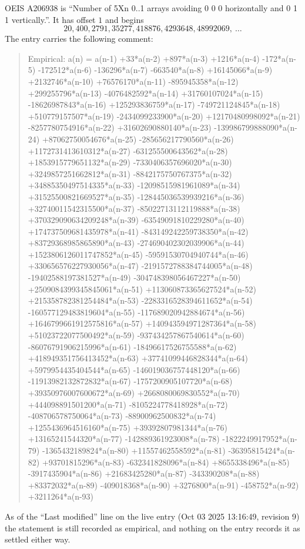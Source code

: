 \documentclass[11pt,a4paper]{article}
\theoremstyle{plain}
\theoremstyle{definition}
\begin{document}
OEIS A206938 is ``Number of 5Xn 0..1 arrays avoiding 0 0 0 horizontally and 0 1 1 vertically.''. It has offset
$1$ and begins
\[
20, 400, 2791, 35277, 418876, 4293648, 48992069,\ \dots
\]
The entry carries the following comment:
\begin{quote}\small
Empirical: a(n) = a(n-1) +33*a(n-2) +897*a(n-3) +1216*a(n-4) -172*a(n-5) -172512*a(n-6) -136296*a(n-7) -663540*a(n-8) +16145066*a(n-9) +2132746*a(n-10) +76576170*a(n-11) -895945358*a(n-12) +299255796*a(n-13) -4076482592*a(n-14) +31760107024*a(n-15) -18626987843*a(n-16) +125293836759*a(n-17) -749721124845*a(n-18) +510779157507*a(n-19) -2434099233900*a(n-20) +12170480998092*a(n-21) -8257780754916*a(n-22) +31602690880140*a(n-23) -139986799888090*a(n-24) +87062750054676*a(n-25) -285656217790560*a(n-26) +1172731413610312*a(n-27) -631255500643562*a(n-28) +1853915779651132*a(n-29) -7330406357696020*a(n-30) +3249857251662812*a(n-31) -8842175750767375*a(n-32) +34885350497514335*a(n-33) -12098515981961089*a(n-34) +31525500821669527*a(n-35) -128445036539939216*a(n-36) +32740011542315500*a(n-37) -85022713112119888*a(n-38) +370329090634209248*a(n-39) -63549091810229280*a(n-40) +174737509681435978*a(n-41) -843149242259738350*a(n-42) +83729368985865890*a(n-43) -274690402302039906*a(n-44) +1523806126011747852*a(n-45) -59591530704940744*a(n-46) +330656576227930056*a(n-47) -2191572788384744005*a(n-48) -19402588197381527*a(n-49) -304748398056467227*a(n-50) +2509084399345845061*a(n-51) +113060873365627524*a(n-52) +215358782381254484*a(n-53) -2283316528394611652*a(n-54) -160577129483819604*a(n-55) -117689020942884674*a(n-56) +1646799661912575816*a(n-57) +140943594971287364*a(n-58) +51023722077500492*a(n-59) -937434257867540614*a(n-60) -86076791906215996*a(n-61) -18496617526755588*a(n-62) +418949351756413452*a(n-63) +37741099446828344*a(n-64) +5979954435404544*a(n-65) -146019036757448120*a(n-66) -11913982132872832*a(n-67) -1757200905107720*a(n-68) +39350976007600672*a(n-69) +2668080069830552*a(n-70) +444098891501200*a(n-71) -8105224778418928*a(n-72) -408706578750064*a(n-73) -88900962500832*a(n-74) +1255436964516160*a(n-75) +39392807981344*a(n-76) +13165241544320*a(n-77) -142889361923008*a(n-78) -1822249917952*a(n-79) -1365432189824*a(n-80) +11557462558592*a(n-81) -36395815424*a(n-82) +93701815296*a(n-83) -632341828096*a(n-84) +8655338496*a(n-85) -3917435904*a(n-86) +21683425280*a(n-87) -343390208*a(n-88) +83372032*a(n-89) -409018368*a(n-90) +3276800*a(n-91) -458752*a(n-92) +3211264*a(n-93)
\end{quote}
As of the ``Last modified'' line on the live entry (Oct 03 2025 13:16:49, revision
9) the statement is still recorded as empirical, and nothing on the entry
records it as settled either way.
\end{document}

